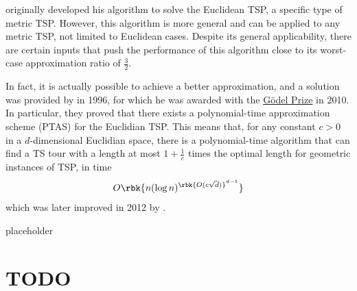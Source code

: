 \documentclass[a4paper, 12pt]{report}
\begin{document}
    \textcite{christofides} originally developed his algorithm to solve the Euclidean TSP, a specific type of metric TSP. However, this algorithm is more general and can be applied to any metric TSP, not limited to Euclidean cases. Despite its general applicability, there are certain inputs that push the performance of this algorithm close to its worst-case approximation ratio of $\frac{3}{2}$.

    In fact, it is actually possible to achieve a better approximation, and a solution was provided by \textcite{arora} in 1996, for which he was awarded with the \href{https://en.wikipedia.org/wiki/G%C3%B6del_Prize}{Gödel Prize} in 2010. In particular, they proved that there exists a polynomial-time approximation scheme (PTAS) for the Euclidian TSP. This means that, for any constant $c > 0$ in a $d$-dimensional Euclidian space, there is a polynomial-time algorithm that can find a TS tour with a length at most $1 + \frac{1}{c}$ times the optimal length for geometric instances of TSP, in time $$O\rbk{n (\log n)^{{\rbk{O(c \sqrt d)}}^{d - 1}}}$$ which was later improved in 2012 by \textcite{bartal}.

    placeholder 

    \chapter{TODO}



    \printbibliography
\end{document}
